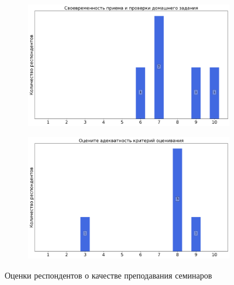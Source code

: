 \begin{figure}[H]
\begin{subfigure}[b]{0.45\textwidth}
                \includegraphics[width=\textwidth]{images/1 course/Информатика/seminarists-marks-Дербышева Т.А.-2.png}
            \end{subfigure}
            \begin{subfigure}[b]{0.45\textwidth}
                \centering
                \includegraphics[width=\textwidth]{images/1 course/Информатика/seminarists-marks-Дербышева Т.А.-3.png}
            \end{subfigure}	
            \caption{Оценки респондентов о качестве преподавания семинаров}
        \end{figure}

    
